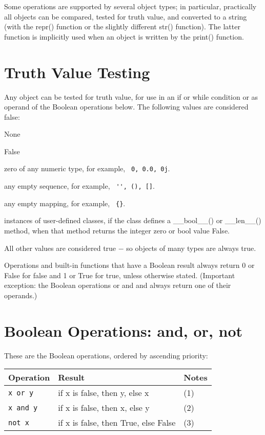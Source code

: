 Some operations are supported by several object types; in particular, practically all objects can be compared, tested for truth value, and converted to a string (with the repr() function or the slightly different str() function). The latter function is implicitly used when an object is written by the print() function.

\section{Truth Value Testing}

Any object can be tested for truth value, for use in an if or while condition or as operand of the Boolean operations below. The following values are considered false:

\vpara
None

False

zero of any numeric type, for example, \verb| 0, 0.0, 0j|.

any empty sequence, for example, \verb| '', (), []|.

any empty mapping, for example, \verb| {}|.

instances of user-defined classes, if the class defines a \_\_bool\_\_() or \_\_len\_\_() method, when that method returns the integer zero or bool value False.

\vpara
All other values are considered true $-$ so objects of many types are always true.

Operations and built-in functions that have a Boolean result always return 0 or False for false and 1 or True for true, unless otherwise stated. (Important exception: the Boolean operations or and and always return one of their operands.)

\section{Boolean Operations:  and, or, not}

These are the Boolean operations, ordered by ascending priority:



\begin{table}[ht]
	\centering
	\begin{tabular}{|l|l|l|}
		\hline
		Operation & Result & Notes\\
		\hline
		\verb|x or y| & if x is false, then y, else x &  (1) \\
		\verb|x and y| & if x is false, then x, else y & (2)  \\
		\verb|not x| & if x is false, then True, else False & (3)  \\								
		\hline
	\end{tabular}
\end{table}


